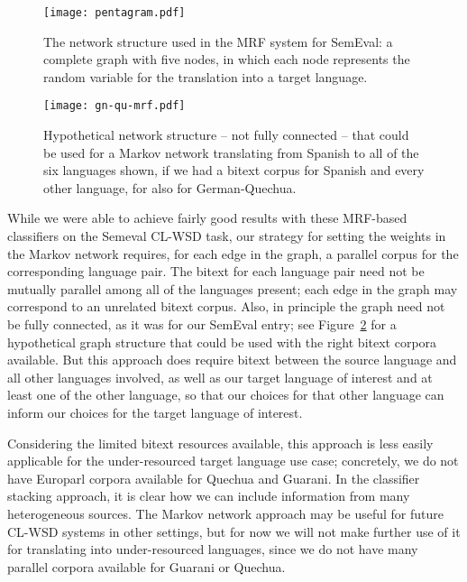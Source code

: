 \begin{figure}
  \begin{center}
  \texttt{[image: pentagram.pdf]}
  \end{center}
  \caption{The network structure used in the MRF system for SemEval: a complete
  graph with five nodes, in which each node represents the random variable for
  the translation into a target language.}
  \label{fig:pentagram}
\end{figure}

\begin{figure}
  \begin{center}
  \texttt{[image: gn-qu-mrf.pdf]}
  \end{center}
  \caption{Hypothetical network structure -- not fully connected -- that could
  be used for a Markov network translating from Spanish to all of the six
  languages shown, if we had a bitext corpus for Spanish and every
  other language, for also for German-Quechua.}
  \label{fig:gn-qu-mrf}
\end{figure}

While we were able to achieve fairly good results with these MRF-based
classifiers on the Semeval CL-WSD task, our strategy for setting the weights in
the Markov network requires, for each edge in the graph, a parallel corpus for
the corresponding language pair. The bitext for each language pair need not be
mutually parallel among all of the languages present; each edge in the graph
may correspond to an unrelated bitext corpus.  Also, in principle the graph
need not be fully connected, as it was for our SemEval entry; see
Figure~\ref{fig:gn-qu-mrf} for a hypothetical graph structure that could be
used with the right bitext corpora available. But this approach
does require bitext between the source language and all other languages
involved, as well as our target language of interest and at least one of the
other language, so that our choices for that other language can inform our
choices for the target language of interest.

Considering the limited bitext resources available, this approach is less
easily applicable for the under-resourced target language use case; concretely,
we do not have Europarl corpora available for Quechua and Guarani. In the
classifier stacking approach, it is clear how we can include information from
many heterogeneous sources. The Markov network approach may be useful for
future CL-WSD systems in other settings, but for now we will not make further
use of it for translating into under-resourced languages, since we do not have
many parallel corpora available for Guarani or Quechua.

